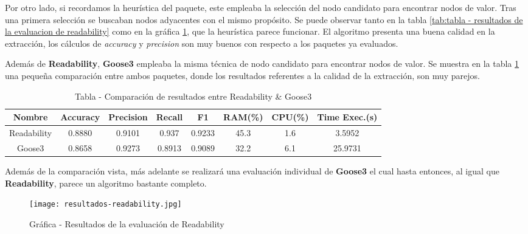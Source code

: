 Por otro lado, si recordamos la heurística del paquete, este empleaba la selección del nodo candidato para
encontrar nodos de valor. Tras una primera selección se buscaban nodos adyacentes con el mismo propósito.
Se puede observar tanto en la tabla \ref{tab:tabla - resultados de la evaluacion de readability} como en
la gráfica \ref{img:grafica - resultados de la evaluacion de readability}, que la heurística parece funcionar.
El algoritmo presenta una buena calidad en la extracción, los cálculos de \emph{accuracy} y \emph{precision}
son muy buenos con respecto a los paquetes ya evaluados.

Además de \textbf{Readability}, \textbf{Goose3} empleaba la misma técnica de nodo candidato para encontrar
nodos de valor. Se muestra en la tabla \ref{tab:tabla - comparacion de resultados entre readability y goose3} 
una pequeña comparación entre ambos paquetes, donde los resultados referentes a la calidad de la extracción, 
son muy parejos.

\begin{table}[h]
    \begin{center}
      \begin{tabular}{| c | c | c | c | c | c | c | c |} \hline 
       \textbf{Nombre} & \textbf{Accuracy} & \textbf{Precision}  & \textbf{Recall} & \textbf{F1} & \textbf{RAM(\%)} & \textbf{CPU(\%)} & \textbf{Time Exec.(s)} \\ \hline
       Readability & 0.8880 & 0.9101 & 0.937 & 0.9233 & 45.3 & 1.6 & 3.5952 \\ \hline
       Goose3 & 0.8658 & 0.9273 & 0.8913 & 0.9089 & 32.2 & 6.1 & 25.9731 \\ \hline
      \end{tabular}
      \caption{Tabla - Comparación de resultados entre Readability \& Goose3}
      \label{tab:tabla - comparacion de resultados entre readability y goose3}
    \end{center}
\end{table}

Además de la comparación vista, más adelante se realizará una evaluación individual de \textbf{Goose3} el
cual hasta entonces, al igual que \textbf{Readability}, parece un algoritmo bastante completo.

\begin{figure}[tphb]
    \centering
    \texttt{[image: resultados-readability.jpg]}
    \caption{Gráfica - Resultados de la evaluación de Readability}
    \label{img:grafica - resultados de la evaluacion de readability}
\end{figure}

